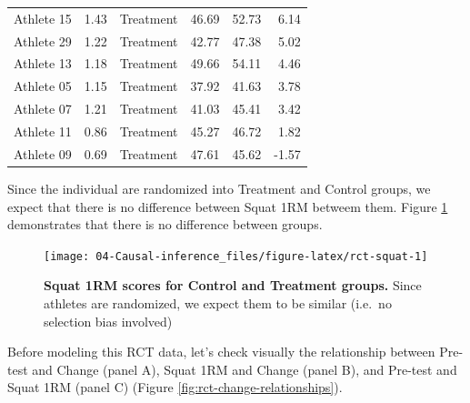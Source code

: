 \documentclass[
]{book}
\begin{document}
\begin{table}
\begin{tabular}[t]{lrlrrr}
Athlete 15 & 1.43 & Treatment & 46.69 & 52.73 & 6.14\\
Athlete 29 & 1.22 & Treatment & 42.77 & 47.38 & 5.02\\
\addlinespace
Athlete 13 & 1.18 & Treatment & 49.66 & 54.11 & 4.46\\
Athlete 05 & 1.15 & Treatment & 37.92 & 41.63 & 3.78\\
Athlete 07 & 1.21 & Treatment & 41.03 & 45.41 & 3.42\\
Athlete 11 & 0.86 & Treatment & 45.27 & 46.72 & 1.82\\
Athlete 09 & 0.69 & Treatment & 47.61 & 45.62 & -1.57\\
\bottomrule
\end{tabular}
\end{table}



Since the individual are randomized into Treatment and Control groups, we expect that there is no difference between Squat 1RM betweem them. Figure \ref{fig:rct-squat} demonstrates that there is no difference between groups.

\begin{figure}

{\centering \texttt{[image: 04-Causal-inference\_files/figure-latex/rct-squat-1]} 

}

\caption{\textbf{Squat 1RM scores for Control and Treatment groups. } Since athletes are randomized, we expect them to be similar (i.e.~no selection bias involved)}\label{fig:rct-squat}
\end{figure}



Before modeling this RCT data, let's check visually the relationship between Pre-test and Change (panel A), Squat 1RM and Change (panel B), and Pre-test and Squat 1RM (panel C) (Figure \ref{fig:rct-change-relationships}).
\end{document}
